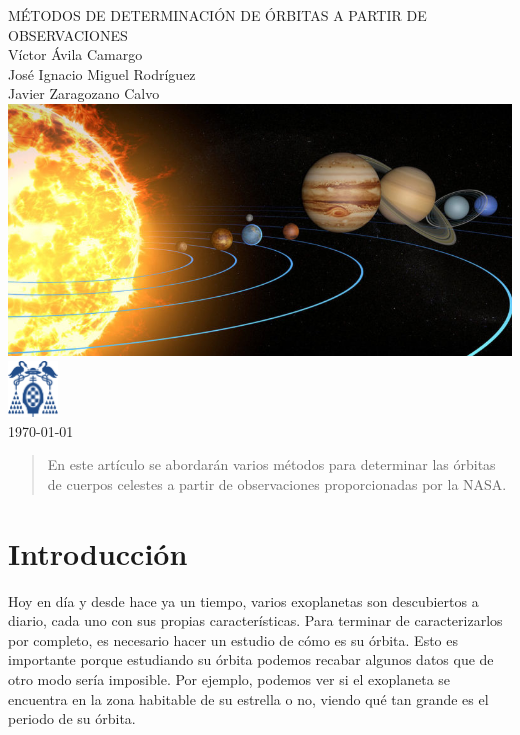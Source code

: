 \documentclass{article}
\numberwithin{equation}{section}
\begin{document}
\begin{titlepage}
    \centering
    {\Huge MÉTODOS DE DETERMINACIÓN DE ÓRBITAS A PARTIR DE OBSERVACIONES \\[1cm]}
    \vspace{1cm} %
    {\Large Víctor Ávila Camargo \\ 
    José Ignacio Miguel Rodríguez \\ 
    Javier Zaragozano Calvo \\[1cm]}
    \includegraphics[width=1\textwidth]{orbitas-del-sistema-solar-e1555647256894.jpg} \\[1cm]
    \includegraphics[width=0.1\textwidth]{aa.png} \\ [1cm]
    {\large \today}
\end{titlepage}
\newpage

\tableofcontents

\newpage

\begin{abstract}
    En este artículo se abordarán varios métodos para determinar 
    las órbitas de cuerpos celestes a partir de observaciones 
    proporcionadas por la NASA.
\end{abstract}
\section{Introducción} %
Hoy en día y desde hace ya un tiempo, 
varios exoplanetas son descubiertos a diario, cada uno con sus propias características. 
Para terminar de caracterizarlos por completo, es necesario 
hacer un estudio de cómo es su órbita. Esto es importante porque estudiando su órbita podemos recabar algunos 
datos que de otro modo sería imposible. 
Por ejemplo, podemos ver si el exoplaneta se encuentra en la zona habitable 
de su estrella o no, viendo qué tan grande es el periodo de su 
órbita. \\
\end{document}
